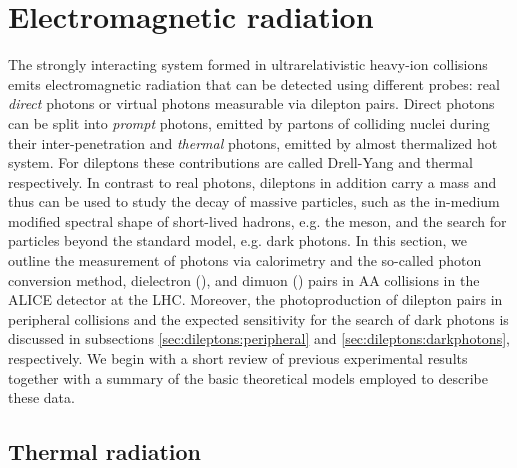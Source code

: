 \documentclass[../report.tex]{subfiles}
\begin{document}
\section{Electromagnetic radiation}

The strongly interacting system formed in ultrarelativistic heavy-ion collisions 
emits electromagnetic radiation that can be detected using different probes: real {\it direct} photons %
or virtual photons measurable via dilepton pairs. 
Direct photons can be split into {\it prompt} photons, emitted by partons of colliding nuclei during their inter-penetration and {\it thermal} photons, emitted by almost thermalized hot system. 
For dileptons these contributions are called Drell-Yang and thermal respectively.
In contrast to real photons, dileptons in addition carry a mass and thus can be used to study the decay of massive particles, such as the in-medium modified spectral shape of short-lived hadrons, e.g. the \Prho meson, and the search for particles beyond the standard model, e.g. dark photons. In this section, we outline the measurement of photons via calorimetry and the so-called photon conversion method, dielectron (\Pepem), and dimuon (\PGmpGmm) pairs in AA collisions in the ALICE detector at the LHC. Moreover, the photoproduction of dilepton pairs in peripheral collisions and the expected sensitivity for the search of dark photons is discussed in subsections \ref{sec:dileptons:peripheral} and \ref{sec:dileptons:darkphotons}, respectively. We begin with a short review of previous experimental results together with a summary of the basic theoretical models employed to describe these data.


\subsection{Thermal radiation}
\end{document}
